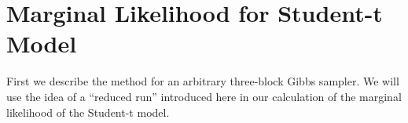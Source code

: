 \documentclass[12pt]{article}
\begin{document}

\section{Marginal Likelihood for Student-t Model}
First we describe the method for an arbitrary three-block Gibbs sampler. 
We will use the idea of a ``reduced run'' introduced here in our calculation of the marginal likelihood of the Student-t model.
\end{document}
